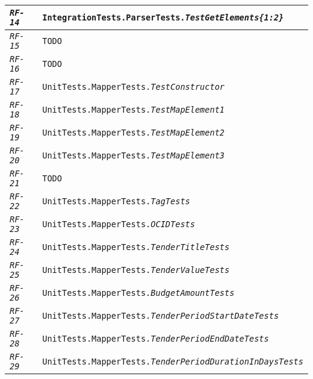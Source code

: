 \begin{longtable}{|| M{3cm} | M{12cm} ||}
                \hline
                    \texttt{\textit{RF-14}} & \texttt{IntegrationTests.ParserTests.\textit{TestGetElements\{1:2\}}} \\
                \hline
                    \texttt{\textit{RF-15}} & \texttt{TODO} \\
                \hline
                    \texttt{\textit{RF-16}} & \texttt{TODO} \\
                \hline
                    \texttt{\textit{RF-17}} & \texttt{UnitTests.MapperTests.\textit{TestConstructor}} \\
                \hline
                    \texttt{\textit{RF-18}} & \texttt{UnitTests.MapperTests.\textit{TestMapElement1}} \\
                \hline
                    \texttt{\textit{RF-19}} & \texttt{UnitTests.MapperTests.\textit{TestMapElement2}} \\
                \hline
                    \texttt{\textit{RF-20}} & \texttt{UnitTests.MapperTests.\textit{TestMapElement3}} \\
                \hline
                    \texttt{\textit{RF-21}} & \texttt{TODO} \\
                \hline
                    \texttt{\textit{RF-22}} & \texttt{UnitTests.MapperTests.\textit{TagTests}} \\
                \hline
                    \texttt{\textit{RF-23}} & \texttt{UnitTests.MapperTests.\textit{OCIDTests}} \\
                \hline
                    \texttt{\textit{RF-24}} & \texttt{UnitTests.MapperTests.\textit{TenderTitleTests}} \\
                \hline
                    \texttt{\textit{RF-25}} & \texttt{UnitTests.MapperTests.\textit{TenderValueTests}} \\
                \hline
                    \texttt{\textit{RF-26}} & \texttt{UnitTests.MapperTests.\textit{BudgetAmountTests}} \\
                \hline
                    \texttt{\textit{RF-27}} & \texttt{UnitTests.MapperTests.\textit{TenderPeriodStartDateTests}} \\
                \hline
                    \texttt{\textit{RF-28}} & \texttt{UnitTests.MapperTests.\textit{TenderPeriodEndDateTests}} \\
                \hline
                    \texttt{\textit{RF-29}} & \texttt{UnitTests.MapperTests.\textit{TenderPeriodDurationInDaysTests}} \\

\end{longtable}
